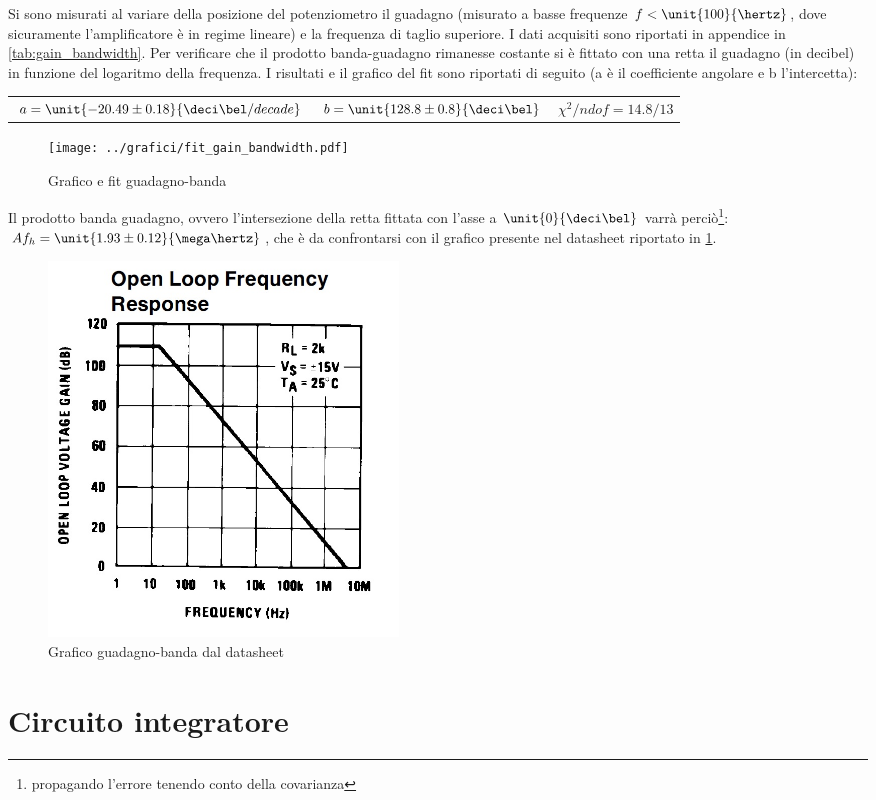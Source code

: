 \documentclass[10pt,a4paper]{article}
\begin{document}
Si sono misurati al variare della posizione del potenziometro il guadagno (misurato a basse frequenze $f < \unit{100}{\hertz}$, dove sicuramente l'amplificatore è in regime lineare) e la frequenza di taglio superiore. I dati acquisiti sono riportati in appendice in \tablename{\ref{tab:gain_bandwidth}}. Per verificare che il prodotto banda-guadagno rimanesse costante si è fittato con una retta il guadagno (in decibel) in funzione del logaritmo della frequenza. I risultati e il grafico del fit sono riportati di seguito (a è il coefficiente angolare e b l'intercetta):

\begin{table}[H]
	\centering
	\begin{tabular}{ccc}
		$a = \unit{-20.49 \pm 0.18}{\deci\bel /decade}$  &  $b = \unit{128.8 \pm 0.8}{\deci\bel}$ & $\chi^2/ndof= 14.8 / 13$
	\end{tabular}
\end{table}

\begin{figure}[H]
	\centering
	\texttt{[image: ../grafici/fit\_gain\_bandwidth.pdf]}
	\caption{Grafico e fit guadagno-banda}
\end{figure}

Il prodotto banda guadagno, ovvero l'intersezione della retta fittata con l'asse a $\unit{0}{\deci\bel}$ varrà perciò\footnote{propagando l'errore tenendo conto della covarianza}: $Af_h=\unit{1.93\pm0.12}{\mega\hertz}$, che è da confrontarsi con il grafico presente nel datasheet riportato in \figurename{\ref{fig:open_loop_stocazzo}}.

\begin{figure}[H]
	\centering
	\includegraphics[width=0.45\textwidth]{../grafici/open_loop_frequency.jpg}
	\caption{Grafico guadagno-banda dal datasheet}
	\label{fig:open_loop_stocazzo}
\end{figure}

\section{Circuito integratore}
\end{document}
